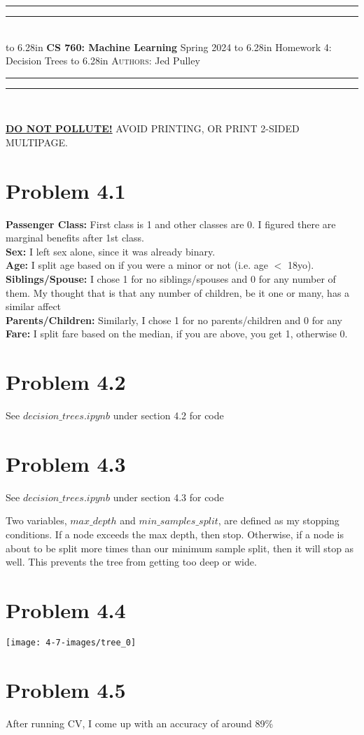 \documentclass{article}
\newcommand{\lecture}[2]{
\pagestyle{myheadings}
\thispagestyle{plain}
\newpage
\noindent
\begin{center}
\rule{\textwidth}{1.6pt}\vspace*{-\baselineskip}\vspace*{2pt} %
\rule{\textwidth}{0.4pt}\\[1\baselineskip] %
\vbox{\vspace{2mm}
\hbox to 6.28in { {\bf CS 760: Machine Learning} \hfill Spring 2024 }
\vspace{4mm}
\hbox to 6.28in { {\Large \hfill #1  \hfill} }
\vspace{4mm}
\hbox to 6.28in { {\scshape Authors:}  #2 \hfill }}
\vspace{-2mm}
\rule{\textwidth}{0.4pt}\vspace*{-\baselineskip}\vspace{3.2pt} %
\rule{\textwidth}{1.6pt}\\[\baselineskip] %
\end{center}
\vspace*{4mm}
}
\begin{document}
\lecture{Homework 4: Decision Trees}{Jed Pulley}

\begin{center}
{\Large {\sf \underline{\textbf{DO NOT POLLUTE!}} AVOID PRINTING, OR PRINT 2-SIDED MULTIPAGE.}}
\end{center}

\section*{Problem 4.1}
\textbf{Passenger Class:} First class is 1 and other classes are 0. I figured there are marginal benefits after 1st class. \\
\textbf{Sex:} I left sex alone, since it was already binary. \\
\textbf{Age:} I split age based on if you were a minor or not (i.e. age $<$ 18yo). \\
\textbf{Siblings/Spouse:} I chose 1 for no siblings/spouses and 0 for any number of them. My thought that is that any number of children, be it one or many, has a similar affect \\
\textbf{Parents/Children:} Similarly, I chose 1 for no parents/children and 0 for any \\
\textbf{Fare:} I split fare based on the median, if you are above, you get 1, otherwise 0.

\section*{Problem 4.2}
See $decision\_trees.ipynb$ under section 4.2 for code

\section*{Problem 4.3}
See $decision\_trees.ipynb$ under section 4.3 for code

Two variables, $max\_depth$ and $min\_samples\_split$, are defined as my  stopping conditions. If a node exceeds the max depth, then stop. Otherwise, if a node is about to be split more times than our minimum sample split, then it will stop as well. This prevents the tree from getting too deep or wide.

\section*{Problem 4.4}
\texttt{[image: 4-7-images/tree\_0]}

\section*{Problem 4.5}
After running CV, I come up with an accuracy of around 89\%
\end{document}
